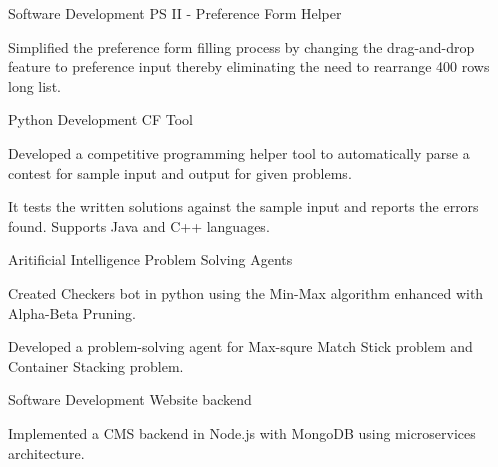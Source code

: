 

\begin{cventries}

  \cventry
    {Software Development} %
    {PS II - Preference Form Helper} %
    {} %
    {} %
    {
      \begin{cvitems}
        \item{Simplified the preference form filling process by changing the
         drag-and-drop feature to preference input thereby eliminating the need
         to rearrange 400 rows long list.}
      \end{cvitems}
    }

  \cventry
    {Python Development} %
    {CF Tool} %
    {} %
    {} %
    {
      \begin{cvitems}
        \item{Developed a competitive programming helper tool to automatically parse
         a contest for sample input and output for given problems.}
        \item{It tests the written solutions against the sample input and reports
         the errors found. Supports Java and C++ languages.}
      \end{cvitems}
    }

  \cventry
    {Aritificial Intelligence} %
    {Problem Solving Agents} %
    {} %
    {} %
    {
      \begin{cvitems}
        \item{Created Checkers bot in python using the Min-Max algorithm enhanced with
         Alpha-Beta Pruning.}
        \item{Developed a problem-solving agent for Max-squre Match Stick problem
         and Container Stacking problem.}
      \end{cvitems}
    }

  \cventry
    {Software Development} %
    {Website backend} %
    {} %
    {} %
    {
      \begin{cvitems}
        \item{Implemented a CMS backend in Node.js with MongoDB using microservices
         architecture.}
      \end{cvitems}
    }

\end{cventries}
